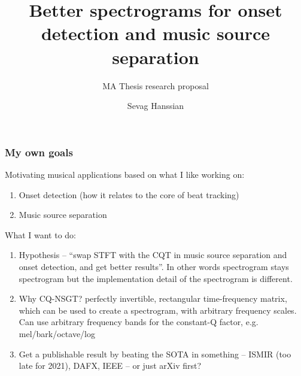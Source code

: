 \documentclass[usenames,dvipsnames]{beamer}
\title{Better spectrograms for onset detection and music source separation}
\subtitle{MA Thesis research proposal}
\author{Sevag Hanssian}
\institute{DDMAL, McGill}
\begin{document}
\begin{frame}
\maketitle
\end{frame}

\begin{frame}
	\frametitle{My own goals}
	Motivating musical applications based on what I like working on:
	\begin{enumerate}
		\item
			Onset detection (how it relates to the core of beat tracking)
		\item
			Music source separation
	\end{enumerate}

	What I want to do:
	\begin{enumerate}
		\item
			Hypothesis -- ``swap STFT with the CQT in music source separation and onset detection, and get better results''. In other words spectrogram stays spectrogram but the implementation detail of the spectrogram is different.
		\item
			Why CQ-NSGT? perfectly invertible, rectangular time-frequency matrix, which can be used to create a spectrogram, with arbitrary frequency scales. Can use arbitrary frequency bands for the constant-Q factor, e.g. mel/bark/octave/log
		\item
			Get a publishable result by beating the SOTA in something -- ISMIR (too late for 2021), DAFX, IEEE -- or just arXiv first?
	\end{enumerate}
\end{frame}
\end{document}
